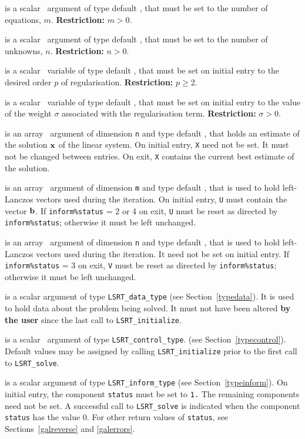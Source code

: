 \documentclass{galahad}
\newcommand{\packagename}{LS\-RT}
\begin{document}
\begin{description}

 is a scalar \intentin\ argument of type default \integer, that must be 
set to the number of equations, $m$. {\bf Restriction: } $m > 0$. 
 
 is a scalar \intentin\ argument of type default \integer, that must be 
set to the number of unknowns, $n$. {\bf Restriction: } $n > 0$. 
 
 is a scalar \intentin\ variable of type default 
\realdp, 
that must be set on initial entry to the desired order $p$ of regularisation.
{\bf Restriction: } $p \geq 2$. 

 is a scalar \intentin\ variable of type default 
\realdp, 
that must be set on initial entry
to the value of the weight $\sigma$ associated with the regularisation term.
{\bf Restriction: } $\sigma > 0$. 
 
 is an array \intentinout\ argument of dimension {\tt n} and  
type default \realdp,  
that holds an estimate of the solution ${\mathbf{x}}$ of the linear system. 
On initial entry, {\tt X} need not be set. 
It must not be changed between entries. 
On exit, {\tt X} contains the current best estimate of the solution. 
 
 is an array \intentinout\ argument of dimension {\tt m} and  
type default \realdp,  
that is used to hold left-Lanczos vectors used during the iteration.
On initial entry, {\tt U} must contain the vector ${\mathbf{b}}$.  
If {\tt inform\%status} = 2 or 4 on exit, {\tt U} must be reset
as directed by  {\tt inform\%status}; otherwise  
it must be left unchanged. 
 
 is an array \intentinout\ argument of dimension {\tt n} and  
type default \realdp,  
that is used to hold left-Lanczos vectors used during the iteration.
It need not be set on initial entry.
If {\tt inform\%status} = 3 on exit, {\tt V} must be reset
as directed by  {\tt inform\%status}; otherwise it must be left unchanged. 
 
 is a scalar \intentinout argument of type 
{\tt \packagename\_data\_type}
(see Section~\ref{typedata}). It is used to hold data about the problem being 
solved. It must not have been altered {\bf by the user} since the last call to 
{\tt \packagename\_initialize}.

 is a scalar \intentin\ argument of type 
{\tt \packagename\_control\_type}. 
(see Section~\ref{typecontrol}). 
Default values may be assigned by calling {\tt \packagename\_initialize} 
prior to the first call to {\tt \packagename\_solve}.  
 
 is a scalar \intentinout argument of type 
{\tt \packagename\_inform\_type}
(see Section~\ref{typeinform}). 
On initial entry, the component {\tt status} must be set to {\tt 1.} 
The remaining components need not be set. 
A successful call to
{\tt \packagename\_solve}
is indicated when the  component {\tt status} has the value 0. 
For other return values of {\tt status}, see Sections~\ref{galreverse} 
and \ref{galerrors}.
\end{description}
\end{document}

